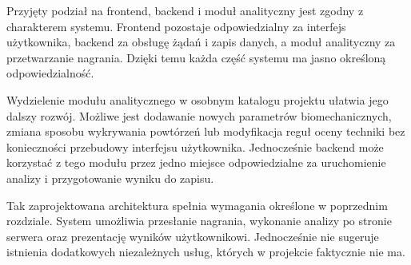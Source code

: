 Przyjęty podział na frontend, backend i moduł analityczny jest zgodny z charakterem systemu. Frontend pozostaje odpowiedzialny za interfejs użytkownika, backend za obsługę żądań i zapis danych, a moduł analityczny za przetwarzanie nagrania. Dzięki temu każda część systemu ma jasno określoną odpowiedzialność.

Wydzielenie modułu analitycznego w osobnym katalogu projektu ułatwia jego dalszy rozwój. Możliwe jest dodawanie nowych parametrów biomechanicznych, zmiana sposobu wykrywania powtórzeń lub modyfikacja reguł oceny techniki bez konieczności przebudowy interfejsu użytkownika. Jednocześnie backend może korzystać z tego modułu przez jedno miejsce odpowiedzialne za uruchomienie analizy i przygotowanie wyniku do zapisu.

Tak zaprojektowana architektura spełnia wymagania określone w poprzednim rozdziale. System umożliwia przesłanie nagrania, wykonanie analizy po stronie serwera oraz prezentację wyników użytkownikowi. Jednocześnie nie sugeruje istnienia dodatkowych niezależnych usług, których w projekcie faktycznie nie ma.
